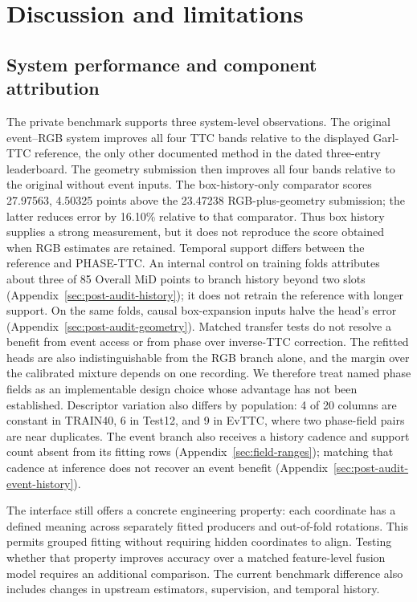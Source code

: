 \section{Discussion and limitations}
\subsection{System performance and component attribution}
The private benchmark supports three system-level observations. The original event--RGB system improves all four TTC bands relative to the displayed Garl-TTC reference, the only other documented method in the dated three-entry leaderboard. The geometry submission then improves all four bands relative to the original without event inputs. The box-history-only comparator scores 27.97563, 4.50325 points above the 23.47238 RGB-plus-geometry submission; the latter reduces error by 16.10\% relative to that comparator. Thus box history supplies a strong measurement, but it does not reproduce the score obtained when RGB estimates are retained. Temporal support differs between the reference and PHASE-TTC. An internal control on training folds attributes about three of 85 Overall MiD points to branch history beyond two slots (Appendix~\ref{sec:post-audit-history}); it does not retrain the reference with longer support. On the same folds, causal box-expansion inputs halve the head's error (Appendix~\ref{sec:post-audit-geometry}). Matched transfer tests do not resolve a benefit from event access or from phase over inverse-TTC correction. The refitted heads are also indistinguishable from the RGB branch alone, and the margin over the calibrated mixture depends on one recording. We therefore treat named phase fields as an implementable design choice whose advantage has not been established. Descriptor variation also differs by population: 4 of 20 columns are constant in TRAIN40, 6 in Test12, and 9 in EvTTC, where two phase-field pairs are near duplicates. The event branch also receives a history cadence and support count absent from its fitting rows (Appendix~\ref{sec:field-ranges}); matching that cadence at inference does not recover an event benefit (Appendix~\ref{sec:post-audit-event-history}).

The interface still offers a concrete engineering property: each coordinate has a defined meaning across separately fitted producers and out-of-fold rotations. This permits grouped fitting without requiring hidden coordinates to align. Testing whether that property improves accuracy over a matched feature-level fusion model requires an additional comparison. The current benchmark difference also includes changes in upstream estimators, supervision, and temporal history.

